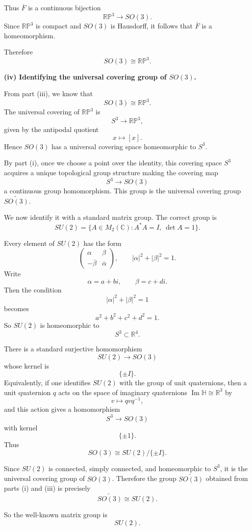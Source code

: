 \documentclass[12pt,a4paper]{article}
\theoremstyle{notespace}
\begin{document}
Thus \(\overline{F}\) is a continuous bijection
\[
\mathbb{RP}^3\to SO(3).
\]
Since \(\mathbb{RP}^3\) is compact and \(SO(3)\) is Hausdorff, it follows that \(\overline{F}\) is a homeomorphism.

Therefore
\[
SO(3)\cong \mathbb{RP}^3.
\]

\medskip

\textbf{(iv) Identifying the universal covering group of \(SO(3)\).}

From part (iii), we know that
\[
SO(3)\cong \mathbb{RP}^3.
\]
The universal covering of \(\mathbb{RP}^3\) is
\[
S^3\to \mathbb{RP}^3,
\]
given by the antipodal quotient
\[
x\mapsto [x].
\]
Hence \(SO(3)\) has a universal covering space homeomorphic to \(S^3\).

By part (i), once we choose a point over the identity, this covering space \(S^3\) acquires a unique topological group structure making the covering map
\[
S^3\to SO(3)
\]
a continuous group homomorphism. This group is the universal covering group \(\widetilde{SO(3)}\).

We now identify it with a standard matrix group. The correct group is
\[
SU(2)=\{A\in M_2(\mathbb C):A^*A=I,\ \det A=1\}.
\]

Every element of \(SU(2)\) has the form
\[
\begin{pmatrix}
	\alpha & \beta\\
	-\overline{\beta} & \overline{\alpha}
\end{pmatrix},
\qquad
|\alpha|^2+|\beta|^2=1.
\]
Write
\[
\alpha=a+bi,
\qquad
\beta=c+di.
\]
Then the condition
\[
|\alpha|^2+|\beta|^2=1
\]
becomes
\[
a^2+b^2+c^2+d^2=1.
\]
So \(SU(2)\) is homeomorphic to
\[
S^3\subset \mathbb R^4.
\]

There is a standard surjective homomorphism
\[
SU(2)\to SO(3)
\]
whose kernel is
\[
\{\pm I\}.
\]
Equivalently, if one identifies \(SU(2)\) with the group of unit quaternions, then a unit quaternion \(q\) acts on the space of imaginary quaternions \(\operatorname{Im}\mathbb H\cong \mathbb R^3\) by
\[
v\mapsto qvq^{-1},
\]
and this action gives a homomorphism
\[
S^3\to SO(3)
\]
with kernel
\[
\{\pm 1\}.
\]
Thus
\[
SO(3)\cong SU(2)/\{\pm I\}.
\]

Since \(SU(2)\) is connected, simply connected, and homeomorphic to \(S^3\), it is the universal covering group of \(SO(3)\). Therefore the group \(\widetilde{SO(3)}\) obtained from parts (i) and (iii) is precisely
\[
\widetilde{SO(3)}\cong SU(2).
\]

So the well-known matrix group is
\[
\boxed{SU(2)}.
\]
\end{document}
